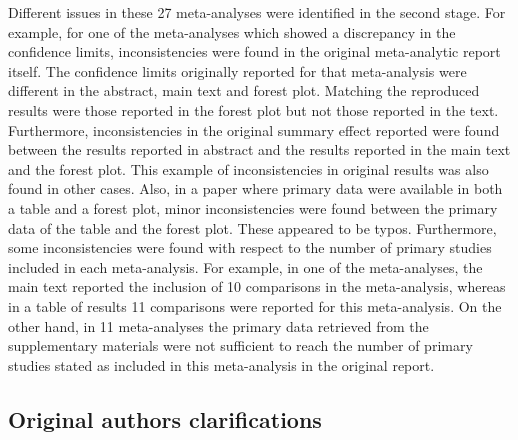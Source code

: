 \documentclass[
  ,jou, a4paper,floatsintext]{apa6}
\begin{document}
Different issues in these 27 meta-analyses were identified in the second stage. For example, for one of the meta-analyses which showed a discrepancy in the confidence limits, inconsistencies were found in the original meta-analytic report itself. The confidence limits originally reported for that meta-analysis were different in the abstract, main text and forest plot. Matching the reproduced results were those reported in the forest plot but not those reported in the text. Furthermore, inconsistencies in the original summary effect reported were found between the results reported in abstract and the results reported in the main text and the forest plot. This example of inconsistencies in original results was also found in other cases. Also, in a paper where primary data were available in both a table and a forest plot, minor inconsistencies were found between the primary data of the table and the forest plot. These appeared to be typos.
Furthermore, some inconsistencies were found with respect to the number of primary studies included in each meta-analysis. For example, in one of the meta-analyses, the main text reported the inclusion of 10 comparisons in the meta-analysis, whereas in a table of results 11 comparisons were reported for this meta-analysis. On the other hand, in 11 meta-analyses the primary data retrieved from the supplementary materials were not sufficient to reach the number of primary studies stated as included in this meta-analysis in the original report.

\hypertarget{original-authors-clarifications}{%
\subsection{Original authors clarifications}\label{original-authors-clarifications}}
\end{document}
